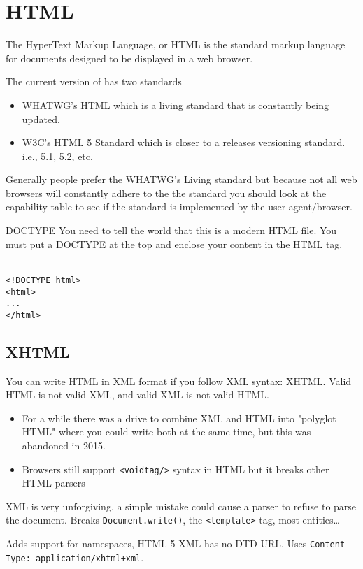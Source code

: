 \documentclass[../CMPUT-404-Notes.tex]{subfiles}
\begin{document}
\chapter{HTML}
The HyperText Markup Language, or HTML is the standard markup language for documents designed to be displayed in a web browser.

The current version of has two standards
\begin{itemize}
  \item WHATWG's HTML which is a living standard that is constantly being updated.
  \item W3C's HTML 5 Standard which is closer to a releases versioning standard. i.e., 5.1, 5.2, etc. 
\end{itemize}
Generally people prefer the WHATWG's Living standard but because not all web browsers will constantly adhere to the the standard you should look at the capability table to see if the standard is implemented by the user agent/browser.

\begin{DndSidebar}[color=PhbLightGreen]{DOCTYPE}
  You need to tell the world that this is a modern HTML file. 
  You must put a DOCTYPE at the top and enclose your content in the HTML tag.
  \\~\\
\begin{verbatim}
<!DOCTYPE html>
<html>
...
</html>
\end{verbatim}
\end{DndSidebar}

\section{XHTML}
You can write HTML in XML format if you follow XML syntax: XHTML.
Valid HTML is not valid XML, and valid XML is not valid HTML. 
\begin{itemize}
  \item For a while there was a drive to combine XML and HTML into "polyglot HTML" where you could write both at the same time, but this was abandoned in 2015.
  \item
  Browsers still support \texttt{<voidtag/>} syntax in HTML but it breaks other HTML parsers
\end{itemize}
XML is very unforgiving,  a simple mistake could cause a parser to refuse to parse the document.
Breaks \texttt{Document.write()}, the \texttt{<template>} tag, most entities\dots

Adds support for namespaces, HTML 5 XML has no DTD URL. Uses \texttt{Content-Type: application/xhtml+xml}.
\end{document}
